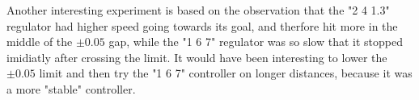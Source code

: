\documentclass[a4paper,10pt]{article}
\begin{document}
		Another interesting experiment is based on the observation that the "2 4 1.3" regulator had higher speed going towards its goal, and therfore hit more in the middle of the $\pm0.05$ gap,
		while the "1 6 7" regulator was so slow that it stopped imidiatly after crossing the limit. It would have been interesting to lower the $\pm0.05$ limit and then try the "1 6 7" controller on
		longer distances, because it was a more "stable" controller.
		
		
\end{document}
